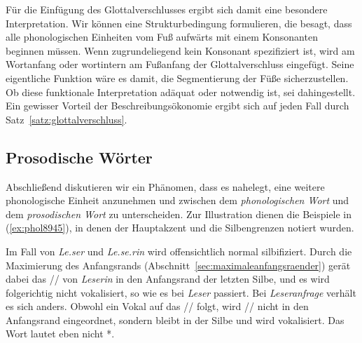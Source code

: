 Für die Einfügung des Glottalverschlusses ergibt sich damit eine besondere Interpretation.
Wir können eine Strukturbedingung formulieren, die besagt, dass alle phonologischen Einheiten vom Fuß aufwärts mit einem Konsonanten beginnen müssen.
Wenn zugrundeliegend kein Konsonant spezifiziert ist, wird am Wortanfang oder wortintern am Fußanfang der Glottalverschluss eingefügt.
Seine eigentliche Funktion wäre es damit, die Segmentierung der Füße sicherzustellen.
Ob diese funktionale Interpretation adäquat oder notwendig ist, sei dahingestellt.
Ein gewisser Vorteil der Beschreibungsökonomie ergibt sich auf jeden Fall durch Satz~\ref{satz:glottalverschluss}.


\subsection{Prosodische Wörter}

\label{sec:prosodischewoerter}

Abschließend diskutieren wir ein Phänomen, dass es nahelegt, eine weitere phonologische Einheit anzunehmen und zwischen dem \textit{phonologischen Wort} und dem \textit{prosodischen Wort} zu unterscheiden.
Zur Illustration dienen die Beispiele in (\ref{ex:phol8945}), in denen der Hauptakzent und die Silbengrenzen notiert wurden.

\begin{exe}
  \ex\label{ex:phol8945}
  \begin{xlist}
  \end{xlist}
\end{exe}

Im Fall von \textit{Le.ser} und \textit{Le.se.rin} wird offensichtlich normal silbifiziert.
Durch die Maximierung des Anfangsrands (Abschnitt~\ref{sec:maximaleanfangsraender}) gerät dabei das // von \textit{Leserin} in den Anfangsrand der letzten Silbe, und es wird folgerichtig nicht vokalisiert, so wie es bei \textit{Leser} passiert.
Bei \textit{Leseranfrage} verhält es sich anders.
Obwohl ein Vokal auf das // folgt, wird // nicht in den Anfangsrand eingeordnet, sondern bleibt in der Silbe \textipa{[z5]} und wird vokalisiert.
Das Wort lautet eben nicht *.

